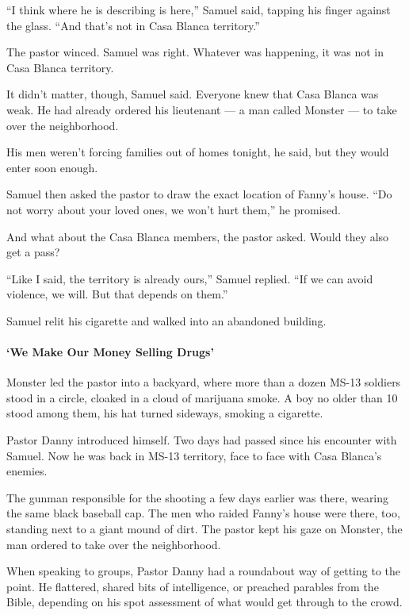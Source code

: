 ``I think where he is describing is here,'' Samuel said, tapping his
finger against the glass. ``And that's not in Casa Blanca territory.''

The pastor winced. Samuel was right. Whatever was happening, it was not
in Casa Blanca territory.

It didn't matter, though, Samuel said. Everyone knew that Casa Blanca
was weak. He had already ordered his lieutenant --- a man called Monster
--- to take over the neighborhood.

His men weren't forcing families out of homes tonight, he said, but they
would enter soon enough.

Samuel then asked the pastor to draw the exact location of Fanny's
house. ``Do not worry about your loved ones, we won't hurt them,'' he
promised.

And what about the Casa Blanca members, the pastor asked. Would they
also get a pass?

``Like I said, the territory is already ours,'' Samuel replied. ``If we
can avoid violence, we will. But that depends on them.''

Samuel relit his cigarette and walked into an abandoned building.

\hypertarget{we-make-our-money-selling-drugs}{%
\paragraph{`We Make Our Money Selling
Drugs'}\label{we-make-our-money-selling-drugs}}

Monster led the pastor into a backyard, where more than a dozen MS-13
soldiers stood in a circle, cloaked in a cloud of marijuana smoke. A boy
no older than 10 stood among them, his hat turned sideways, smoking a
cigarette.

Pastor Danny introduced himself. Two days had passed since his encounter
with Samuel. Now he was back in MS-13 territory, face to face with Casa
Blanca's enemies.

The gunman responsible for the shooting a few days earlier was there,
wearing the same black baseball cap. The men who raided Fanny's house
were there, too, standing next to a giant mound of dirt. The pastor kept
his gaze on Monster, the man ordered to take over the neighborhood.

When speaking to groups, Pastor Danny had a roundabout way of getting to
the point. He flattered, shared bits of intelligence, or preached
parables from the Bible, depending on his spot assessment of what would
get through to the crowd.

